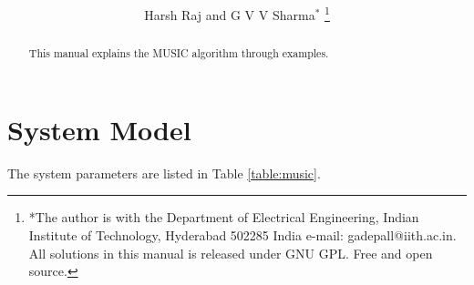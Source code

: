 \documentclass[journal,12pt,twocolumn]{IEEEtran}
\renewcommand\thesection{\arabic{section}}
\begin{document}
\let\StandardTheFigure\thefigure



\makeatletter
{}
\makeatother

\let\StandardTheFigure\thefigure
\let\StandardTheTable\thetable
\let\vec\mathbf





\def\putbox#1#2#3{\makebox[0in][l]{\makebox[#1][l]{}\raisebox{\baselineskip}[0in][0in]{\raisebox{#2}[0in][0in]{#3}}}}
     \def\rightbox#1{\makebox[0in][r]{#1}}
     \def\centbox#1{\makebox[0in]{#1}}
     \def\topbox#1{\raisebox{-\baselineskip}[0in][0in]{#1}}
     \def\midbox#1{\raisebox{-0.5\baselineskip}[0in][0in]{#1}}

\vspace{3cm}

\title{ 
}

\author{ Harsh Raj and G V V Sharma$^{*}$%
	\thanks{*The author is with the Department
		of Electrical Engineering, Indian Institute of Technology, Hyderabad
		502285 India e-mail:  gadepall@iith.ac.in. All solutions in this manual is released under GNU 
GPL.  Free and open source.}
	
}	

\maketitle

\tableofcontents

\bigskip
\renewcommand{\thetable}{\theenumi}
\begin{abstract}
This manual explains the MUSIC algorithm through examples.
\end{abstract}
%
\section{System Model}
The system parameters are listed in Table \ref{table:music}.
\end{document}
